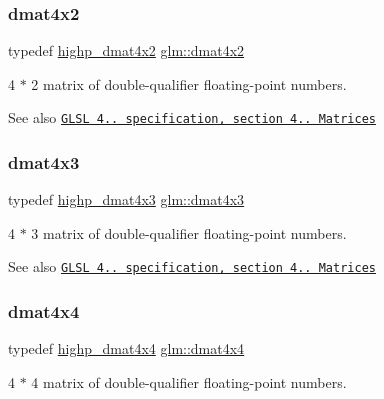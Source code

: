 \subsubsection{\texorpdfstring{dmat4x2}{dmat4x2}}
{\footnotesize\ttfamily typedef \hyperlink{group__core__precision_ga22c6b4fe5bb2e33a3cfa1c026803dd68}{highp\+\_\+dmat4x2} \hyperlink{group__core__types_gab3d51ce41e6f0aa267d3e185cee09c44}{glm\+::dmat4x2}}

4 $\ast$ 2 matrix of double-\/qualifier floating-\/point numbers.

\begin{DoxySeeAlso}{See also}
\href{http://www.opengl.org/registry/doc/GLSLangSpec.4.20.8.pdf}{\tt G\+L\+SL 4.. specification, section 4.. Matrices} 
\end{DoxySeeAlso}
\mbox{\label{group__core__types_gaa4a157ac183c5bd5dcbd555a94b1b505}} 
\subsubsection{\texorpdfstring{dmat4x3}{dmat4x3}}
{\footnotesize\ttfamily typedef \hyperlink{group__core__precision_ga9a5dab260df6e8c46c747bac0b8d2f38}{highp\+\_\+dmat4x3} \hyperlink{group__core__types_gaa4a157ac183c5bd5dcbd555a94b1b505}{glm\+::dmat4x3}}

4 $\ast$ 3 matrix of double-\/qualifier floating-\/point numbers.

\begin{DoxySeeAlso}{See also}
\href{http://www.opengl.org/registry/doc/GLSLangSpec.4.20.8.pdf}{\tt G\+L\+SL 4.. specification, section 4.. Matrices} 
\end{DoxySeeAlso}
\mbox{\label{group__core__types_ga54d90d4b902d93638b906571af215bb1}} 
\subsubsection{\texorpdfstring{dmat4x4}{dmat4x4}}
{\footnotesize\ttfamily typedef \hyperlink{group__core__precision_gad3df38df8c4f7ef9b38f03581ff60142}{highp\+\_\+dmat4x4} \hyperlink{group__core__types_ga54d90d4b902d93638b906571af215bb1}{glm\+::dmat4x4}}

4 $\ast$ 4 matrix of double-\/qualifier floating-\/point numbers.

